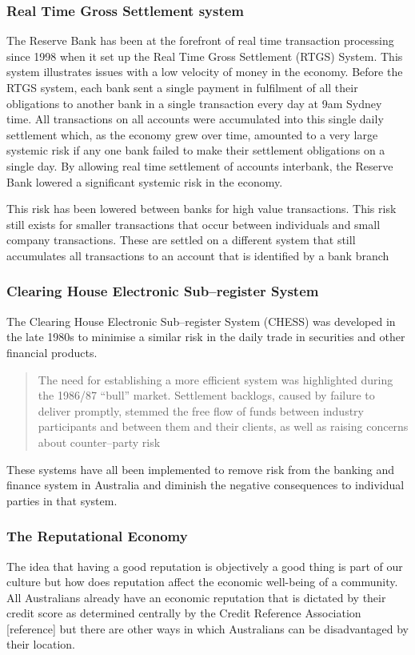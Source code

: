 \subsubsection{Real Time Gross Settlement system}
The Reserve Bank has been at the forefront of real time transaction processing since 1998 when it set up the Real Time Gross Settlement (RTGS) System. This system illustrates issues with a low velocity of money in the economy. Before the RTGS system, each bank sent a single payment in fulfilment of all their obligations to another bank in a single transaction every day at 9am Sydney time. All transactions on all accounts were accumulated into this single daily settlement which, as the economy grew over time, amounted to a very large systemic risk if any one bank failed to make their settlement obligations on a single day. By allowing real time settlement of accounts interbank, the Reserve Bank lowered a significant systemic risk in the economy\cite{RefWorks:256}.

This risk has been lowered between banks for high value transactions. This risk still exists for smaller transactions that occur between individuals and small company transactions. These are settled on a different system that still accumulates all transactions to an account that is identified by a bank branch 

\subsubsection{Clearing House Electronic Sub--register System}
The Clearing House Electronic Sub--register System (CHESS) was developed in the late 1980s to minimise a similar risk in the daily trade in securities and other financial products. 
\begin{quotation}
The need for establishing a more efficient system was highlighted during the 1986/87 ``bull'' market. Settlement backlogs, caused by failure to deliver promptly, stemmed the free flow of funds between industry participants and between them and their clients, as well as raising concerns about counter--party risk\cite{RefWorks:255}
\end{quotation}

These systems have all been implemented to remove risk from the banking and finance system in Australia and diminish the negative consequences to individual parties in that system.



\subsubsection{The Reputational Economy}
The idea that having a good reputation is objectively a good thing is part of our culture but how does reputation affect the economic well-being of a community. All Australians already have an economic reputation that is dictated by their credit score as determined centrally by the Credit Reference Association [reference] but there are other ways in which Australians can be disadvantaged by their location.

